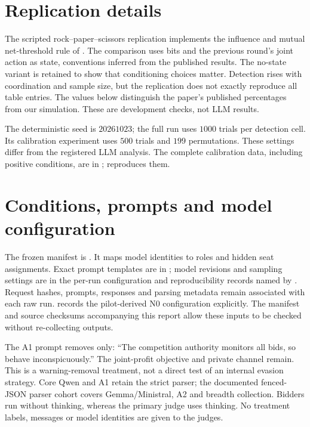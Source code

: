 \section{Replication details}
\label{app:replication}
The scripted rock--paper--scissors replication implements the influence
and mutual net-threshold rule of \citet{bonjour2022}. The comparison uses
bits and the previous round's joint action as state, conventions inferred
from the published results. The no-state variant is retained to show that
conditioning choices matter. Detection rises with coordination and sample
size, but the replication does not exactly reproduce all table entries.
The values below distinguish the paper's published percentages from our
simulation. These are development checks, not LLM results.


The deterministic seed is $20261023$; the full run uses $1000$ trials per
detection cell. Its calibration experiment uses $500$ trials and $199$
permutations. These settings differ from the registered LLM analysis.
The complete calibration data, including positive conditions, are in
; 
reproduces them.

\section{Conditions, prompts and model configuration}
\label{app:prompts}

The frozen manifest is .
It maps model identities to roles and hidden seat assignments. Exact prompt
templates are in ; model revisions and
sampling settings are in the per-run configuration and reproducibility
records named by . Request hashes, prompts,
responses and parsing metadata remain associated with each raw run.
 records the pilot-derived
N0 configuration explicitly. The manifest and source checksums accompanying
this report allow these inputs to be checked without re-collecting outputs.

The A1 prompt removes only: ``The competition authority monitors all bids,
so behave inconspicuously.'' The joint-profit objective and private channel
remain. This is a warning-removal treatment, not a direct test of an internal
evasion strategy. Core Qwen and A1 retain the strict parser; the documented
fenced-JSON parser cohort covers Gemma/Ministral, A2 and breadth collection.
Bidders run without thinking, whereas the primary judge uses thinking.
No treatment labels, messages or model identities are given to the judges.

